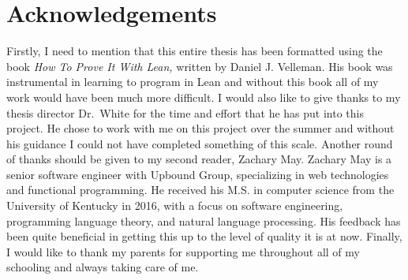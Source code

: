 \documentclass[
  letterpaper,
]{scrreprt}
\renewcommand*\contentsname{Table of contents}
\newcommand\contentsname{Table of contents}
\theoremstyle{remark}
\begin{document}
\newenvironment{ndfn}[1]
  {\renewcommand{\defnm}{#1}\begin{nameddfn}}
  {\end{nameddfn}}

\newenvironment{npf}[1]
  {\begin{proof}[#1]}
  {\end{proof}}


\let\oldgreater\textgreater
\renewcommand{\textgreater}{\null\oldgreater}   %

\ifdefined\Shaded\renewenvironment{Shaded}{\begin{tcolorbox}[interior hidden, frame hidden, enhanced, sharp corners, boxrule=0pt, breakable, borderline west={3pt}{0pt}{shadecolor}]}{\end{tcolorbox}}\fi

\renewcommand*\contentsname{Table of contents}
{
\hypersetup{linkcolor=}
\setcounter{tocdepth}{1}
\tableofcontents
}

\hypertarget{acknowledgements}{%
\chapter*{Acknowledgements}\label{acknowledgements}}



Firstly, I need to mention that this entire thesis has been formatted
using the book \emph{How To Prove It With Lean,} written by Daniel J.
Velleman. His book was instrumental in learning to program in Lean and
without this book all of my work would have been much more difficult. I
would also like to give thanks to my thesis director Dr.~White for the
time and effort that he has put into this project. He chose to work with
me on this project over the summer and without his guidance I could not
have completed something of this scale. Another round of thanks should
be given to my second reader, Zachary May. Zachary May is a senior
software engineer with Upbound Group, specializing in web technologies
and functional programming. He received his M.S. in computer science
from the University of Kentucky in 2016, with a focus on software
engineering, programming language theory, and natural language
processing. His feedback has been quite beneficial in getting this up to
the level of quality it is at now. Finally, I would like to thank my
parents for supporting me throughout all of my schooling and always
taking care of me.
\end{document}
